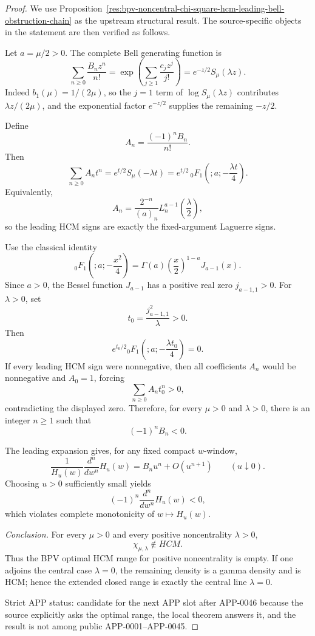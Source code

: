 \documentclass[11pt]{article}
\numberwithin{equation}{section}
\theoremstyle{definition}
\theoremstyle{remark}
\newcommand{\1}{\mathbf 1}
\begin{document}
\begin{proof}
We use Proposition~\ref{res:bpv-noncentral-chi-square-hcm-leading-bell-obstruction-chain} as the upstream structural result. The source-specific objects in the statement are then verified as follows.

Let \(a=\mu/2>0\). The complete Bell generating function is
\[
\sum_{n\ge0}\frac{B_nz^n}{n!}
=\exp\left(\sum_{j\ge1}\frac{c_jz^j}{j!}\right)
=e^{-z/2}S_\mu(\lambda z).
\]
Indeed \(b_1(\mu)=1/(2\mu)\), so the \(j=1\) term of \(\log S_\mu(\lambda z)\) contributes \(\lambda z/(2\mu)\), and the exponential factor \(e^{-z/2}\) supplies the remaining \(-z/2\).

Define
\[
A_n=\frac{(-1)^nB_n}{n!}.
\]
Then
\[
\sum_{n\ge0}A_nt^n
=e^{t/2}S_\mu(-\lambda t)
=e^{t/2}\,{}_0F_1\left(;a;-\frac{\lambda t}{4}\right).
\]
Equivalently,
\[
A_n=\frac{2^{-n}}{(a)_n}L_n^{a-1}\left(\frac{\lambda}{2}\right),
\]
so the leading HCM signs are exactly the fixed-argument Laguerre signs.

Use the classical identity
\[
{}_0F_1\left(;a;-\frac{x^2}{4}\right)
=\Gamma(a)\left(\frac{x}{2}\right)^{1-a}J_{a-1}(x).
\]
Since \(a>0\), the Bessel function \(J_{a-1}\) has a positive real zero \(j_{a-1,1}>0\). For \(\lambda>0\), set
\[
t_0=\frac{j_{a-1,1}^2}{\lambda}>0.
\]
Then
\[
e^{t_0/2}{}_0F_1\left(;a;-\frac{\lambda t_0}{4}\right)=0.
\]
If every leading HCM sign were nonnegative, then all coefficients \(A_n\) would be nonnegative and \(A_0=1\), forcing
\[
\sum_{n\ge0}A_nt_0^n>0,
\]
contradicting the displayed zero. Therefore, for every \(\mu>0\) and \(\lambda>0\), there is an integer \(n\ge1\) such that
\[
(-1)^nB_n<0.
\]

The leading expansion gives, for any fixed compact \(w\)-window,
\[
\frac{1}{H_u(w)}\frac{d^n}{dw^n}H_u(w)
=B_nu^n+O(u^{n+1})
\qquad(u\downarrow0).
\]
Choosing \(u>0\) sufficiently small yields
\[
(-1)^n\frac{d^n}{dw^n}H_u(w)<0,
\]
which violates complete monotonicity of \(w\mapsto H_u(w)\).

\emph{Conclusion.}
For every \(\mu>0\) and every positive noncentrality \(\lambda>0\),
\[
\chi_{\mu,\lambda}\notin HCM.
\]
Thus the BPV optimal HCM range for positive noncentrality is empty. If one adjoins the central case \(\lambda=0\), the remaining density is a gamma density and is HCM; hence the extended closed range is exactly the central line \(\lambda=0\).

Strict APP status: candidate for the next APP slot after APP-0046 because the source explicitly asks the optimal range, the local theorem answers it, and the result is not among public APP-0001--APP-0045.
\end{proof}
\end{document}
